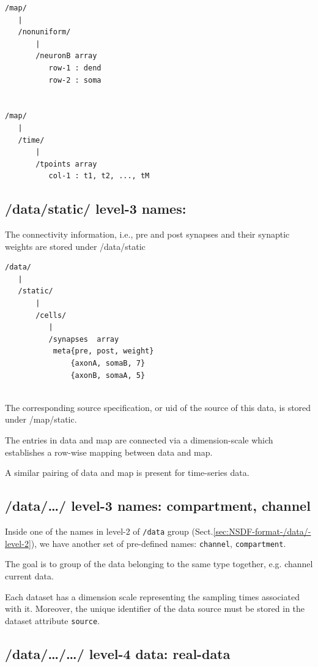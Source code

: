 \begin{verbatim}
/map/
   |
   /nonuniform/
       |
       /neuronB array 
          row-1 : dend
          row-2 : soma


/map/
   |
   /time/
       |
       /tpoints array 
          col-1 : t1, t2, ..., tM
\end{verbatim}

\subsection{/data/static/ level-3 names: }
\label{sec:NSDF-format-/data/static/-level-3}

The connectivity information, i.e., pre and post synapses and their
synaptic weights are stored under /data/static

\begin{verbatim}
/data/
   |
   /static/
       |
       /cells/
          |
          /synapses  array
           meta{pre, post, weight}
               {axonA, somaB, 7}
               {axonB, somaA, 5}
             
\end{verbatim}

The corresponding source specification, or uid of the source of this data, is
stored under /map/static.

The entries in data and map are connected via a dimension-scale which
establishes a row-wise mapping between data and map.

A similar pairing of data and map is present for time-series
data.

\subsection{/data/\ldots/ level-3 names: compartment, channel}
\label{sec:NSDF-format-/data/-level-3}

Inside one of the names in level-2 of \verb!/data! group
(Sect.\ref{sec:NSDF-format-/data/-level-2}), we have another set of pre-defined
names: \verb!channel!, \verb!compartment!.

The goal is to group of the data belonging to the same type together, e.g.
channel current data. 

Each dataset has a dimension scale representing the sampling times associated
with it. Moreover, the unique
identifier of the data source must be stored in the dataset
attribute \verb!source!.

\subsection{/data/\ldots/\ldots/ level-4 data: real-data}
\label{sec:NSDF-format-/data/-level-4}


